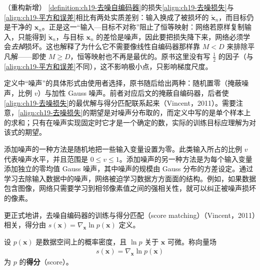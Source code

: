 \documentclass[../../main.tex]{subfiles}
\begin{document}
\begin{remark}（重构新增）
\cref{definition:ch19-去噪自编码器}的损失\eqref{align:ch19-去噪损失}与\eqref{align:ch19-平方和误差}相比有两处实质差别：输入换成了被损坏的 $\tilde{\bm{x}}_n$，而目标仍是干净的 $\bm{x}_n$。正是这一“输入—目标不对称”阻止了恒等映射：网络若原样复制输入，只能得到 $\tilde{\bm{x}}_n$，与目标 $\bm{x}_n$ 的差恰是噪声，因此要把损失降下来，网络必须学会\emph{去掉}损坏。这也解释了为什么它不需要像线性自编码器那样靠 $M<D$ 来排除平凡解——即使 $M\geqslant D$，恒等映射也不再是最优的。原书这里没有写 $\frac{1}{2}$ 的因子（与\eqref{align:ch19-平方和误差}不同），这不影响极小点，只影响梯度尺度。

定义中“噪声”的具体形式由使用者选择，原书随后给出两种：随机置零（掩蔽噪声，比例 $v$）与加性 Gauss 噪声。前者对应后文的掩蔽自编码器，后者使\eqref{align:ch19-去噪损失}的最优解与得分匹配联系起来（Vincent，2011）。需要注意，\eqref{align:ch19-去噪损失}的期望是对噪声分布取的，而定义中写的是单个样本上的求和；只有在噪声实现固定时它才是一个确定的数，实际的训练目标应理解为对该式的期望。
\end{remark}

添加噪声的一种方法是随机地把一些输入变量设置为零。此类输入所占的比例 $v$ 代表噪声水平，并且范围是 $0\leqslant v\leqslant 1$。添加噪声的另一种方法是为每个输入变量添加独立的零均值 Gauss 噪声，其中噪声的规模由 Gauss 分布的方差设定。通过学习去除输入数据中的噪声，网络被迫学习数据方方面面的结构。例如，如果数据包含图像，网络只需要学习到相邻像素值之间的强相关性，就可以纠正被噪声损坏的像素。

更正式地讲，去噪自编码器的训练与得分匹配（score matching）（Vincent，2011）相关，得分由 $s(\bm{x})=\nabla_{\bm{x}}\ln p(\bm{x})$ 定义。

\begin{definition}[得分]\label{definition:ch19-得分}
设 $p(\bm{x})$ 是数据空间上的概率密度，且 $\ln p$ 关于 $\bm{x}$ 可微。称向量场
\begin{align*}
s(\bm{x})=\nabla_{\bm{x}}\ln p(\bm{x})
\end{align*}
为 $p$ 的\textbf{得分}（score）。
\end{definition}
\end{document}
